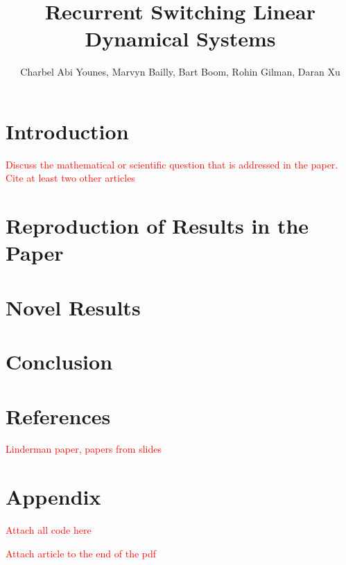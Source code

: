 \documentclass{article}
\title{Recurrent Switching Linear Dynamical Systems}
\author{Charbel Abi Younes, Marvyn Bailly, Bart Boom, Rohin Gilman, Daran Xu}
\date{}
\begin{document}
\maketitle

\section{Introduction}

\textcolor{red}{Discuss the mathematical or scientific question that is addressed in the paper. Cite at least two other articles}

\section{Reproduction of Results in the Paper}

\section{Novel Results}

\section{Conclusion}

\section{References}

\textcolor{red}{Linderman paper, papers from slides}

\section{Appendix}

\textcolor{red}{Attach all code here}

\textcolor{red}{Attach article to the end of the pdf}
\end{document}
